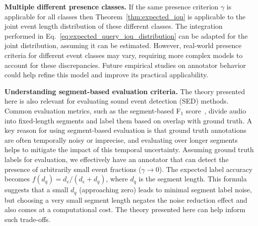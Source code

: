 \textbf{Multiple different presence classes.}
If the same presence criterion $\gamma$ is applicable for all classes then Theorem~\ref{thm:expected_iou} is applicable to the joint event length distribution of these different classes. The integration performed in Eq.~\ref{eq:expected_query_iou_distribution} can be adapted for the joint distribution, assuming it can be estimated. However, real-world presence criteria for different event classes may vary, requiring more complex models to account for these discrepancies. Future empirical studies on annotator behavior could help refine this model and improve its practical applicability.


\textbf{Understanding segment-based evaluation criteria.}
The theory presented here is also relevant for evaluating sound event detection (SED) methods. Common evaluation metrics, such as the segment-based F$_1$ score~\citep{Mesaros2016}, divide audio into fixed-length segments and label them based on overlap with ground truth. A key reason for using segment-based evaluation is that ground truth annotations are often temporally noisy or imprecise, and evaluating over longer segments helps to mitigate the impact of this temporal uncertainty. Assuming ground truth labels for evaluation, we effectively have an annotator that can detect the presence of arbitrarily small event fractions ($\gamma \rightarrow 0$). The expected label accuracy becomes $f(d_q) = d_e / (d_e + d_q)$, where $d_q$ is the segment length. This formula suggests that a small $d_q$ (approaching zero) leads to minimal segment label noise, but choosing a very small segment length negates the noise reduction effect and also comes at a computational cost. The theory presented here can help inform such trade-offs. %

